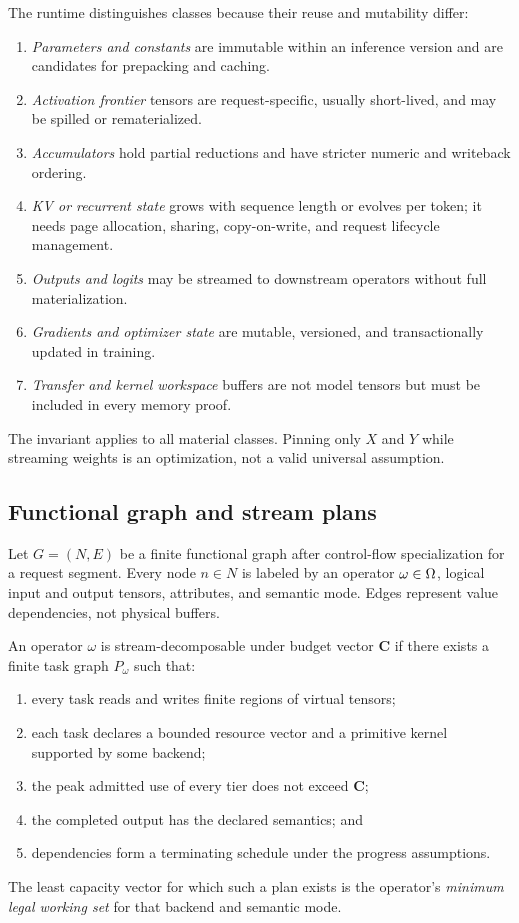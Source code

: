 The runtime distinguishes classes because their reuse and mutability differ:

\begin{enumerate}
  \item \emph{Parameters and constants} are immutable within an inference version and are candidates for prepacking and caching.
  \item \emph{Activation frontier} tensors are request-specific, usually short-lived, and may be spilled or rematerialized.
  \item \emph{Accumulators} hold partial reductions and have stricter numeric and writeback ordering.
  \item \emph{KV or recurrent state} grows with sequence length or evolves per token; it needs page allocation, sharing, copy-on-write, and request lifecycle management.
  \item \emph{Outputs and logits} may be streamed to downstream operators without full materialization.
  \item \emph{Gradients and optimizer state} are mutable, versioned, and transactionally updated in training.
  \item \emph{Transfer and kernel workspace} buffers are not model tensors but must be included in every memory proof.
\end{enumerate}

The invariant applies to all material classes. Pinning only $X$ and $Y$ while streaming weights is an optimization, not a valid universal assumption.

\subsection{Functional graph and stream plans}

Let $G=(N,E)$ be a finite functional graph after control-flow specialization for a request segment. Every node $n\in N$ is labeled by an operator $\omega\in\Omega$, logical input and output tensors, attributes, and semantic mode. Edges represent value dependencies, not physical buffers.

\begin{definition}
An operator $\omega$ is stream-decomposable under budget vector $\mathbf C$ if there exists a finite task graph $P_\omega$ such that:
\begin{enumerate}
  \item every task reads and writes finite regions of virtual tensors;
  \item each task declares a bounded resource vector and a primitive kernel supported by some backend;
  \item the peak admitted use of every tier does not exceed $\mathbf C$;
  \item the completed output has the declared semantics; and
  \item dependencies form a terminating schedule under the progress assumptions.
\end{enumerate}
The least capacity vector for which such a plan exists is the operator's \emph{minimum legal working set} for that backend and semantic mode.
\end{definition}

